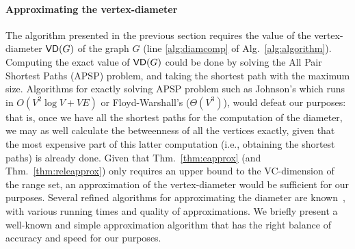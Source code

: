 \paragraph{Approximating the vertex-diameter}%
The algorithm presented in the previous section requires the value of the
vertex-diameter $\mathsf{VD}(G)$ of the graph $G$ (line
\ref{alg:diamcomp} of Alg.~\ref{alg:algorithm}). 
Computing the exact value of $\mathsf{VD}(G)$ could be done by solving the All Pair
Shortest Paths (APSP) problem, and taking the shortest path with the maximum size.
Algorithms for exactly solving APSP problem such as Johnson's which runs in
$O(V^2\log V+VE)$ or Floyd-Warshall's ($\Theta(V^3)$), would defeat our
purposes: that is, once we have all the shortest paths for the
computation of the diameter, we may as well calculate
the betweenness of all the vertices exactly, given that the most expensive part
of this latter computation (i.e., obtaining the shortest paths) is already done.
Given that Thm.~\ref{thm:eapprox} (and Thm.~\ref{thm:releapprox})  only
requires an upper bound to the VC-dimension of the range set, an approximation
of the vertex-diameter would be sufficient for our purposes. Several refined
algorithms for approximating the diameter are
known~\citep{AingwordCIM99,BoitmanisFL06,RodittyW12}, with various running times
and quality of approximations. We briefly present a well-known and simple
approximation algorithm that has the right balance of accuracy and speed
for our purposes.

